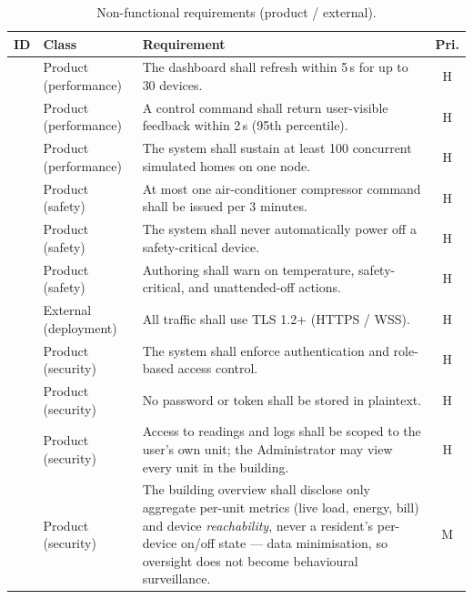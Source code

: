 \begin{table}[htbp]
\centering
\caption{Non-functional requirements (product / external).}
\label{tab:nfr}
\small
\begin{tabularx}{\linewidth}{@{}l l Y c@{}}
\toprule
\textbf{ID} & \textbf{Class} & \textbf{Requirement} & \textbf{Pri.}\\
\midrule
{} & Product (performance) & The dashboard shall refresh within 5\,s for up to 30 devices. & H\\
 & Product (performance) & A control command shall return user-visible feedback within 2\,s (95th percentile). & H\\
 & Product (performance) & The system shall sustain at least 100 concurrent simulated homes on one node. & H\\
 & Product (safety) & At most one air-conditioner compressor command shall be issued per 3 minutes. & H\\
 & Product (safety) & The system shall never automatically power off a safety-critical device. & H\\
 & Product (safety) & Authoring shall warn on temperature, safety-critical, and unattended-off actions. & H\\
 & External (deployment) & All traffic shall use TLS 1.2+ (HTTPS / WSS). & H\\
 & Product (security) & The system shall enforce authentication and role-based access control. & H\\
 & Product (security) & No password or token shall be stored in plaintext. & H\\
 & Product (security) & Access to readings and logs shall be scoped to the user's own unit; the Administrator may view every unit in the building. & H\\
 & Product (security) & The building overview shall disclose only aggregate per-unit metrics (live load, energy, bill) and device \emph{reachability}, never a resident's per-device on/off state --- data minimisation, so oversight does not become behavioural surveillance. & M\\
\bottomrule
\end{tabularx}
\end{table}

